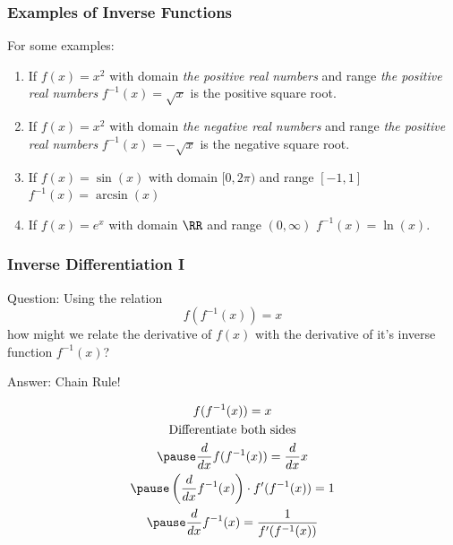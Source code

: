 \documentclass{ltx-talk}
\begin{document}
\begin{frame}
  \frametitle{Examples of Inverse Functions}
  For some examples: \pause
  \begin{enumerate}
    \item If $f(x) = x^2$ with domain \textit{the positive real numbers} and range \textit{the positive real numbers} \pause $f^{-1}(x) = \sqrt{x}$ is the positive square root. \pause
    \item If $f(x) = x^2$ with domain \textit{the negative real numbers} and range \textit{the positive real numbers} \pause $f^{-1}(x) = - \sqrt{x}$
      is the negative square root. \pause
    \item If $f(x) = \sin(x)$ with domain $[0, 2\pi)$ and range $[-1, 1]$ \pause $f^{-1}(x) = \arcsin(x)$  \pause
    \item If $f(x) = e^x$ with domain $\RR$ and range $(0, \infty)$ \pause
      $f^{-1}(x) = \ln(x)$.
  \end{enumerate}
\end{frame}

\begin{frame}
  \frametitle{Inverse Differentiation I}

  Question: Using the relation
  \begin{equation}
    f(f^{-1}(x)) = x
  \end{equation}
how might we relate the derivative of $f(x)$ with the derivative of it's inverse function $f^{-1}(x)$? \pause

Answer: Chain Rule! \pause

\begin{gather}
  f(f^{-1}(x)) = x \\
  \text{Differentiate both sides} \\ \pause
  \dfrac{d}{dx} f(f^{-1}(x)) = \dfrac{d}{dx} x \\ \pause
  \left(\dfrac{d}{dx} f^{-1}(x)\right) \cdot f'(f^{-1}(x)) = 1 \\ \pause
  \dfrac{d}{dx} f^{-1}(x) = \dfrac{1}{f'(f^{-1}(x))}
\end{gather} 
 \end{frame}
\end{document}
